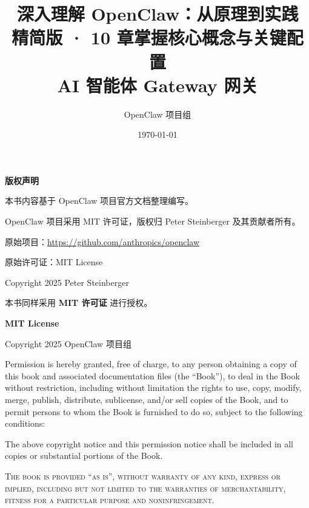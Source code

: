 \documentclass[a4paper,12pt,openany]{book}
\title{
    \vspace{2cm}
{\Huge\textbf{深入理解 OpenClaw：从原理到实践}} \\
    \vspace{0.5cm}
    {\Large 精简版 · 10 章掌握核心概念与关键配置} \\
    \vspace{0.5cm}
    {\large AI 智能体 Gateway 网关}
    \vspace{2cm}
}
\author{OpenClaw 项目组}
\date{\today}
\begin{document}
\maketitle
\thispagestyle{empty}

\clearpage
\thispagestyle{empty}
\vspace*{\fill}
\begin{center}
{\large\textbf{版权声明}}
\end{center}

\bigskip

\noindent 本书内容基于 OpenClaw 项目官方文档整理编写。

\medskip

\noindent OpenClaw 项目采用 MIT 许可证，版权归 Peter Steinberger 及其贡献者所有。

\medskip

\noindent 原始项目：\url{https://github.com/anthropics/openclaw}

\noindent 原始许可证：MIT License

\noindent Copyright \textcopyright{} 2025 Peter Steinberger

\bigskip

\noindent 本书同样采用 \textbf{MIT 许可证} 进行授权。

\bigskip

\noindent \textbf{MIT License}

\medskip

\noindent Copyright \textcopyright{} 2025 OpenClaw 项目组

\medskip

\noindent Permission is hereby granted, free of charge, to any person obtaining a copy
of this book and associated documentation files (the ``Book''), to deal
in the Book without restriction, including without limitation the rights
to use, copy, modify, merge, publish, distribute, sublicense, and/or sell
copies of the Book, and to permit persons to whom the Book is furnished to
do so, subject to the following conditions:

\medskip

\noindent The above copyright notice and this permission notice shall be included in all
copies or substantial portions of the Book.

\medskip

\noindent \textsc{The book is provided ``as is'', without warranty of any kind, express or
implied, including but not limited to the warranties of merchantability,
fitness for a particular purpose and noninfringement.}

\vspace*{\fill}

\tableofcontents
\clearpage












\end{document}
